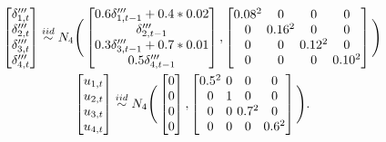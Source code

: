 \documentclass[twoside,11pt]{article}
\begin{document}
\begin{equation}
\begin{gathered}
\begin{bmatrix}
\delta_{1,t}^{\prime\prime\prime}  \\
\delta_{2,t}^{\prime\prime\prime} \\
\delta_{3,t}^{\prime\prime\prime} \\
\delta_{4,t}^{\prime\prime\prime} 
\end{bmatrix}\stackrel{iid}\sim N_4\Bigg(
\begin{bmatrix}
0.6\delta_{1,t-1}^{\prime\prime\prime}+0.4*0.02  \\
\delta_{2,t-1}^{\prime\prime\prime} \\
0.3\delta_{3,t-1}^{\prime\prime\prime}+0.7*0.01 \\
0.5\delta_{4,t-1}^{\prime\prime\prime}
\end{bmatrix},
\begingroup %
\setlength\arraycolsep{1.8pt}
\begin{bmatrix}
0.08^2&0 & 0 & 0\\
0&0.16^2 & 0 & 0\\
0& 0 & 0.12^2 & 0\\
0& 0 & 0 & 0.10^2
\end{bmatrix}
\endgroup\Bigg)\\
\begin{bmatrix}
u_{1,t}  \\
u_{2,t} \\
u_{3,t} \\
u_{4,t}
\end{bmatrix}\stackrel{iid}\sim N_4\Bigg(
\begin{bmatrix}
0  \\
0 \\
0 \\
0
\end{bmatrix},
\begingroup %
\setlength\arraycolsep{1.8pt}
\begin{bmatrix}
0.5^2&0 & 0 & 0\\
0&1 & 0 & 0\\
0 & 0 & 0.7^2 & 0\\
0 & 0 & 0 & 0.6^2
\end{bmatrix}
\endgroup\Bigg).
\end{gathered}
\end{equation}
\end{document}
